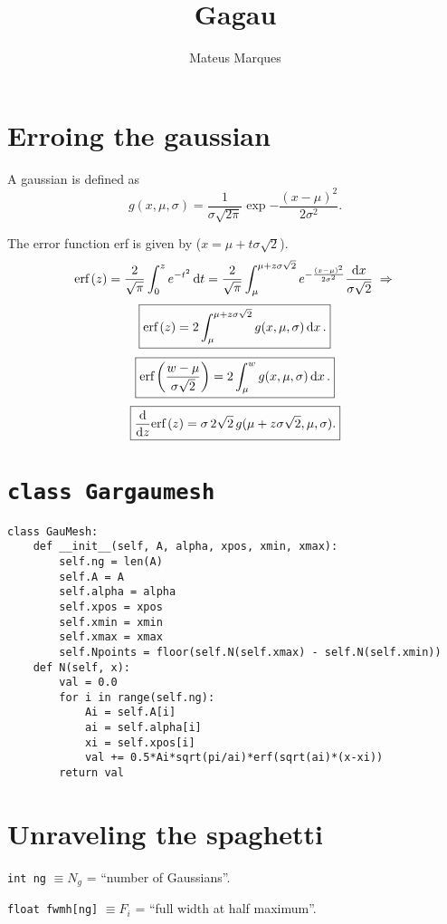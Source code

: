 \documentclass[a4paper,fleqn,12pt]{article}
\title{\Huge{\textbf{Gagau}}}
\author{Mateus Marques}
\begin{document}
\maketitle

\section{Erroing the gaussian}

A gaussian is defined as
$$
g(x, \mu, \sigma) = \frac{1}{\sigma \sqrt{2\pi}} \exp{-\frac{(x-\mu)^2}{2 \sigma^2}}.
$$

The error function erf is given by ($x = \mu + t\sigma \sqrt{2}$).
$$
\text{erf}\left(z\right) = \frac{2}{\sqrt{\pi}} \int_0^z e^{-t^2} \dd{t} =
\frac{2}{\sqrt{\pi}} \int_\mu^{\mu + z \sigma \sqrt{2}}
e^{-\frac{(x-\mu)^2}{2\sigma^2}} \frac{\dd{x}}{\sigma \sqrt{2}} \; \Rightarrow \;
$$
$$
\boxed{
\text{erf}\left(z\right) = 2 \int_\mu^{\mu+z\sigma\sqrt{2}} g(x, \mu, \sigma) \dd{x}. }
$$
$$
\boxed{
\text{erf}\left(\frac{w-\mu}{\sigma\sqrt{2}}\right) = 2 \int_\mu^{w} g(x, \mu, \sigma) \dd{x}. }
$$
$$
\boxed{
\dv{z} \text{erf}\left(z\right) = \sigma \, 2\sqrt{2} \, g(\mu + z\sigma\sqrt{2}, \mu, \sigma).}
$$


\section{\texttt{class Gargaumesh}}

\begin{verbatim}
class GauMesh:
    def __init__(self, A, alpha, xpos, xmin, xmax):
        self.ng = len(A)
        self.A = A
        self.alpha = alpha
        self.xpos = xpos
        self.xmin = xmin
        self.xmax = xmax
        self.Npoints = floor(self.N(self.xmax) - self.N(self.xmin))
    def N(self, x):
        val = 0.0
        for i in range(self.ng):
            Ai = self.A[i]
            ai = self.alpha[i]
            xi = self.xpos[i]
            val += 0.5*Ai*sqrt(pi/ai)*erf(sqrt(ai)*(x-xi))
        return val
\end{verbatim}

\pagebreak

\section{Unraveling the spaghetti}

\texttt{int ng} $\equiv N_g$ = ``number of Gaussians''.

\texttt{float fwmh[ng]} $\equiv F_i$ =  ``full width at half maximum''.
\end{document}
